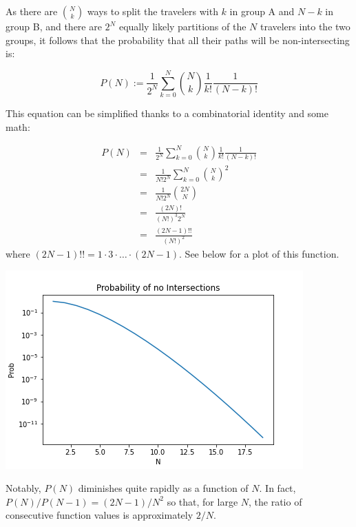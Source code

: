 \documentclass[10pt,a4paper]{article}
\begin{document}
As there are ${N \choose k}$ ways to split the travelers with $k$ in group A and $N-k$ in group B, and there are $2^N$ equally likely partitions of the $N$ travelers into the two groups, it follows that the probability that all their paths will be non-intersecting is:

\begin{equation}
P(N) := \frac{1}{2^N}\sum_{k = 0}^{N}{N \choose k}\frac{1}{k!}\frac{1}{(N-k)!}
\end{equation}

This equation can be simplified thanks to a combinatorial identity and some math:

\begin{eqnarray*}
P(N) & = & \frac{1}{2^N}\sum_{k = 0}^{N}{N \choose k}\frac{1}{k!}\frac{1}{(N-k)!}\\
 & = & \frac{1}{N!2^N}\sum_{k = 0}^{N}{N \choose k}^2\\
 & = & \frac{1}{N!2^N}{2N \choose N}\\
 & = & \frac{(2N)!}{(N!)^3 2^N}\\
 & = & \frac{(2N-1)!!}{(N!)^2}
\end{eqnarray*}
where $(2N-1)!! = 1\cdot 3\cdot \ldots \cdot (2N-1)$. See below for a plot of this function.

\includegraphics[width=\textwidth]{Prob}

Notably, $P(N)$ diminishes quite rapidly as a function of $N$. In fact, $P(N)/P(N-1) = (2N-1)/N^2$ so that, for large $N$, the ratio of consecutive function values is approximately $2/N$.
\end{document}
